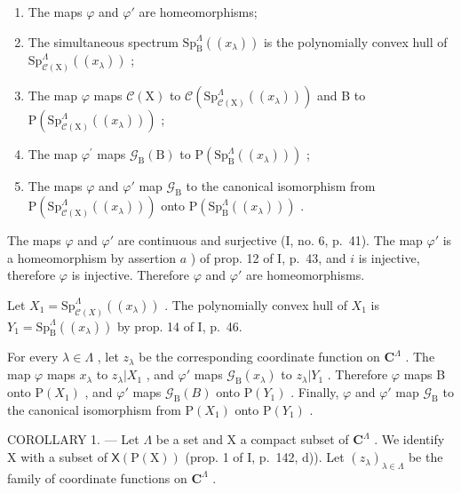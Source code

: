 \begin{enumerate}
\def\labelenumi{\alph{enumi})}
\item
  The maps \(\varphi\) and \(\varphi'\) are homeomorphisms;
\item
  The simultaneous spectrum \(\mathrm{Sp}_{\mathrm{B}}^{\Lambda}((x_{\lambda}))\) is the polynomially convex hull of \(\mathrm{Sp}_{\mathcal{C}(\mathrm{X})}^{\Lambda}((x_{\lambda}))\) ;
\item
  The map \(\varphi\) maps \(\mathcal{C}(\mathrm{X})\) to \(\mathcal{C}(\mathrm{Sp}_{\mathcal{C}(\mathrm{X})}^{\Lambda}((x_{\lambda})))\) and B to \(\mathrm{P}(\mathrm{Sp}_{\mathcal{C}(\mathrm{X})}^{\Lambda}((x_{\lambda})))\) ;
\item
  The map \(\varphi^{\prime}\) maps \(\mathcal{G}_{\mathrm{B}}(\mathrm{B})\) to \(\mathrm{P}(\mathrm{Sp}_{\mathrm{B}}^{\Lambda}((x_{\lambda})))\) ;
\item
  The maps \(\varphi\) and \(\varphi'\) map \(\mathcal{G}_{\mathrm{B}}\) to the canonical isomorphism from \(\mathrm{P}(\mathrm{Sp}_{\mathcal{C}(\mathrm{X})}^{\Lambda}((x_{\lambda})))\) onto \(\mathrm{P}(\mathrm{Sp}_{\mathrm{B}}^{\Lambda}((x_{\lambda})))\) .
\end{enumerate}

The maps \(\varphi\) and \(\varphi'\) are continuous and surjective (I, no. 6, p.~41). The map \(\varphi'\) is a homeomorphism by assertion \(a\) ) of prop. 12 of I, p.~43, and \(i\) is injective, therefore \(\varphi\) is injective. Therefore \(\varphi\) and \(\varphi'\) are homeomorphisms.

Let \(X_{1} = \mathrm{Sp}_{\mathcal{C}(X)}^{\Lambda}((x_{\lambda}))\) . The polynomially convex hull of \(X_{1}\) is \(Y_{1} = \mathrm{Sp}_{\mathrm{B}}^{\Lambda}((x_{\lambda}))\) by prop. 14 of I, p.~46.

For every \(\lambda\in\Lambda\) , let \(z_{\lambda}\) be the corresponding coordinate function on \(\mathbf{C}^{\Lambda}\) . The map \(\varphi\) maps \(x_{\lambda}\) to \(z_{\lambda}|X_{1}\) , and \(\varphi'\) maps \(\mathcal{G}_{\mathrm{B}}(x_{\lambda})\) to \(z_{\lambda}|Y_{1}\) . Therefore \(\varphi\) maps B onto \(\mathrm{P}(X_{1})\) , and \(\varphi'\) maps \(\mathcal{G}_{\mathrm{B}}(B)\) onto \(\mathrm{P}(Y_{1})\) . Finally, \(\varphi\) and \(\varphi'\) map \(\mathcal{G}_{\mathrm{B}}\) to the canonical isomorphism from \(\mathrm{P}(X_{1})\) onto \(\mathrm{P}(Y_{1})\) .

COROLLARY 1. --- Let \(\Lambda\) be a set and X a compact subset of \(\mathbf{C}^{\Lambda}\) . We identify X with a subset of \(\mathsf{X}(\mathrm{P}(\mathrm{X}))\) (prop. 1 of I, p.~142, d)). Let \((z_{\lambda})_{\lambda \in \Lambda}\) be the family of coordinate functions on \(\mathbf{C}^{\Lambda}\) .

